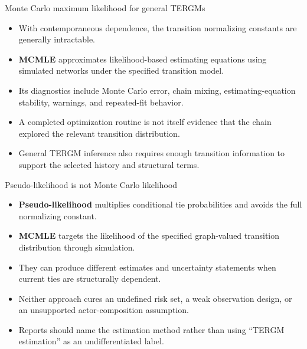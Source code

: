 \documentclass[aspectratio=169,11pt]{beamer}
\newcommand{\term}[1]{\textbf{\color{nupurple}#1}}
\begin{document}
\begin{frame}{Monte Carlo maximum likelihood for general TERGMs}
\begin{itemize}
\item With contemporaneous dependence, the transition normalizing constants are generally intractable.
\item \term{MCMLE} approximates likelihood-based estimating equations using simulated networks under the specified transition model.
\item Its diagnostics include Monte Carlo error, chain mixing, estimating-equation stability, warnings, and repeated-fit behavior.
\item A completed optimization routine is not itself evidence that the chain explored the relevant transition distribution.
\item General TERGM inference also requires enough transition information to support the selected history and structural terms.
\end{itemize}
\end{frame}

\begin{frame}{Pseudo-likelihood is not Monte Carlo likelihood}
\begin{itemize}
\item \term{Pseudo-likelihood} multiplies conditional tie probabilities and avoids the full normalizing constant.
\item \term{MCMLE} targets the likelihood of the specified graph-valued transition distribution through simulation.
\item They can produce different estimates and uncertainty statements when current ties are structurally dependent.
\item Neither approach cures an undefined risk set, a weak observation design, or an unsupported actor-composition assumption.
\item Reports should name the estimation method rather than using ``TERGM estimation'' as an undifferentiated label.
\end{itemize}
\end{frame}
\end{document}
